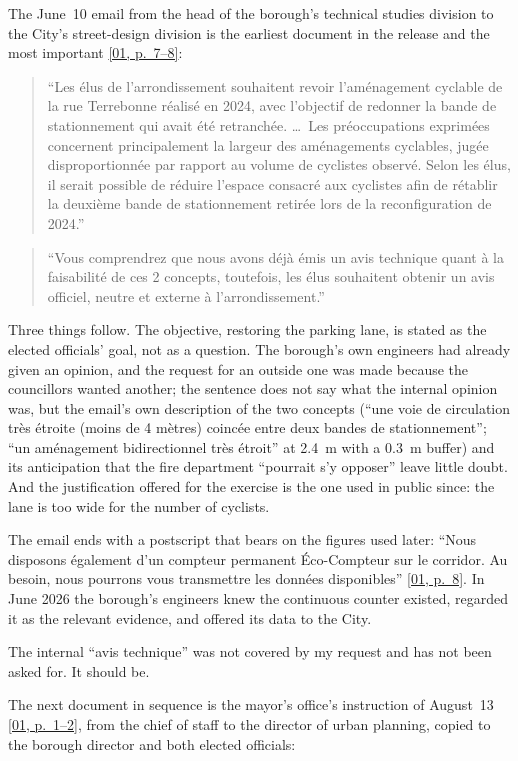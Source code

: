 \documentclass[11pt,letterpaper]{article}
\newcommand{\pagesurl}{https://openmobilitydata.github.io/Terrebonne-access-requests}
\newcommand{\pgl}[3]{\href{\pagesurl/\csname bundle#1\endcsname\#page=#2}{\textsf{\small[#1, p.~#3]}}}
\newcommand{\pg}[2]{\pgl{#1}{#2}{#2}}
\newcommand{\quot}[1]{\begin{quote}\small #1\end{quote}}
\begin{document}
The June~10 email from the head of the borough's technical studies division
to the City's street-design division is the earliest document in the
release and the most important \pgl{01}{7}{7--8}:

\quot{``Les \'elus de l'arrondissement souhaitent revoir l'am\'enagement cyclable
de la rue Terrebonne r\'ealis\'e en 2024, avec l'objectif de redonner la bande de
stationnement qui avait \'et\'e retranch\'ee. \ldots\ Les pr\'eoccupations
exprim\'ees concernent principalement la largeur des am\'enagements cyclables,
jug\'ee disproportionn\'ee par rapport au volume de cyclistes observ\'e. Selon
les \'elus, il serait possible de r\'eduire l'espace consacr\'e aux cyclistes
afin de r\'etablir la deuxi\`eme bande de stationnement retir\'ee lors de la
reconfiguration de 2024.''}

\quot{``Vous comprendrez que nous avons d\'ej\`a \'emis un avis technique quant
\`a la faisabilit\'e de ces 2 concepts, toutefois, les \'elus souhaitent obtenir
un avis officiel, neutre et externe \`a l'arrondissement.''}

Three things follow. The objective, restoring the parking lane, is stated as
the elected officials' goal, not as a question. The borough's own engineers
had already given an opinion, and the request for an outside one was made
because the councillors wanted another; the sentence does not say what the
internal opinion was, but the email's own description of the two concepts
(``une voie de circulation tr\`es \'etroite (moins de 4 m\`etres) coinc\'ee
entre deux bandes de stationnement''; ``un am\'enagement bidirectionnel
tr\`es \'etroit'' at 2.4~m with a 0.3~m buffer) and its anticipation that the
fire department ``pourrait s'y opposer'' leave little doubt. And the
justification offered for the exercise is the one used in public since:
the lane is too wide for the number of cyclists.

The email ends with a postscript that bears on the figures used later:
``Nous disposons \'egalement d'un compteur permanent \'Eco-Compteur sur le
corridor. Au besoin, nous pourrons vous transmettre les donn\'ees
disponibles'' \pg{01}{8}. In June 2026 the borough's engineers knew the
continuous counter existed, regarded it as the relevant evidence, and
offered its data to the City.

The internal ``avis technique'' was not covered by my request and has not
been asked for. It should be.

The next document in sequence is the mayor's office's instruction of
August~13 \pgl{01}{1}{1--2}, from the chief of staff to the director of
urban planning, copied to the borough director and both elected officials:
\end{document}
